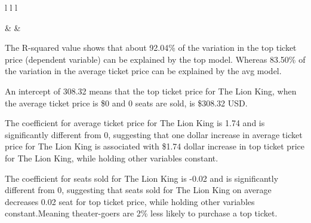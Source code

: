 \documentclass[
]{article}
\begin{document}
\begin{table}[ht]
\begin{centerbox}
\begin{threeparttable}
\begin{tabular}{l l l}
\hhline{}

 &
 &
 \tabularnewline[-0.5pt]



 \tabularnewline[-0.5pt]


\hhline{}
\end{tabular}
\end{threeparttable}\par\end{centerbox}

\end{table}
 

The R-squared value shows that about 92.04\% of the variation in the top ticket price (dependent variable) can be explained by the top model. Whereas 83.50\% of the variation in the average ticket price can be explained by the avg model.

An intercept of 308.32 means that the top ticket price for The Lion King, when the average ticket price is \$0 and 0 seats are sold, is \$308.32 USD.

The coefficient for average ticket price for The Lion King is 1.74 and is significantly different from 0, suggesting that one dollar increase in average ticket price for The Lion King is associated with \$1.74 dollar increase in top ticket price for The Lion King, while holding other variables constant.

The coefficient for seats sold for The Lion King is -0.02 and is significantly different from 0, suggesting that seats sold for The Lion King on average decreases 0.02 seat for top ticket price, while holding other variables constant.Meaning theater-goers are 2\% less likely to purchase a top ticket.
\end{document}
